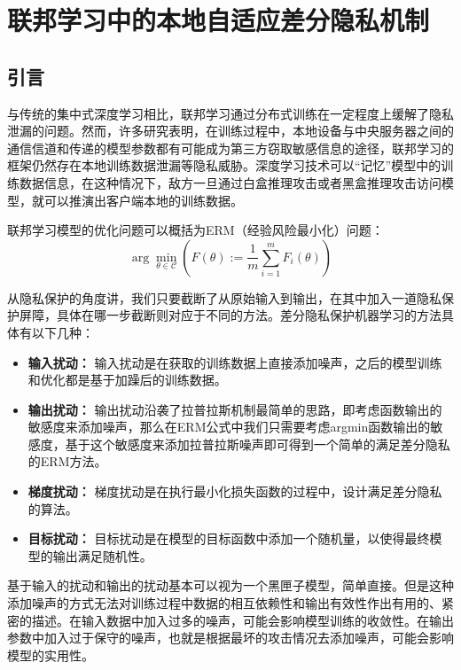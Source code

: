 \chapter{联邦学习中的本地自适应差分隐私机制}

\label{ch3}

\section{引言}
与传统的集中式深度学习相比，联邦学习通过分布式训练在一定程度上缓解了隐私泄漏的问题。然而，许多研究表明，在训练过程中，本地设备与中央服务器之间的通信信道和传递的模型参数都有可能成为第三方窃取敏感信息的途径，联邦学习的框架仍然存在本地训练数据泄漏等隐私威胁。深度学习技术可以“记忆”模型中的训练数据信息，在这种情况下，敌方一旦通过白盒推理攻击或者黑盒推理攻击访问模型，就可以推演出客户端本地的训练数据。

联邦学习模型的优化问题可以概括为ERM（经验风险最小化）问题：
\begin{equation}\label{eq:ERM}
\arg \min _{\theta \in \mathcal{C}}\left(F(\theta):=\frac{1}{m} \sum_{i=1}^{m} F_{i}(\theta)\right)
\end{equation}

从隐私保护的角度讲，我们只要截断了从原始输入到输出，在其中加入一道隐私保护屏障，具体在哪一步截断则对应于不同的方法。差分隐私保护机器学习的方法具体有以下几种：
\begin{itemize}
	\item \textbf{输入扰动：} 输入扰动是在获取的训练数据上直接添加噪声，之后的模型训练和优化都是基于加躁后的训练数据。
	\item \textbf{输出扰动：} 输出扰动沿袭了拉普拉斯机制最简单的思路，即考虑函数输出的敏感度来添加噪声，那么在ERM公式中我们只需要考虑argmin函数输出的敏感度，基于这个敏感度来添加拉普拉斯噪声即可得到一个简单的满足差分隐私的ERM方法。
	\item \textbf{梯度扰动：} 梯度扰动是在执行最小化损失函数的过程中，设计满足差分隐私的算法。
	\item \textbf{目标扰动：} 目标扰动是在模型的目标函数中添加一个随机量，以使得最终模型的输出满足随机性。
\end{itemize}

基于输入的扰动和输出的扰动基本可以视为一个黑匣子模型，简单直接。但是这种添加噪声的方式无法对训练过程中数据的相互依赖性和输出有效性作出有用的、紧密的描述。在输入数据中加入过多的噪声，可能会影响模型训练的收敛性。在输出参数中加入过于保守的噪声，也就是根据最坏的攻击情况去添加噪声，可能会影响模型的实用性。

